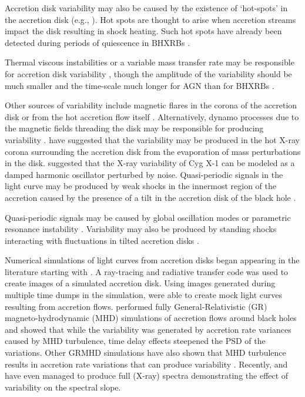 \documentclass[a4paper,fleqn,usenatbib]{mnras}
\begin{document}
Accretion disk variability may also be caused by the existence of `hot-spots' in the accretion disk (e.g., \citealt{MaccaroneAccretion}). Hot spots are thought to arise when accretion streams impact the disk resulting in shock heating. Such hot spots have already been detected during periods of quiescence in BHXRBs \citep{Froning11,McClintock95}.

Thermal viscous instabilities or a variable mass transfer rate may be responsible for accretion disk variability \citep{Lasota01,Coriat12}, though the amplitude of the variability should be much smaller and the time-scale much longer for AGN than for BHXRBs \citep{Hameury09}.

Other sources of variability include magnetic flares in the corona of the accretion disk \citep{PoutanenFabian99} or from the hot accretion flow itself \citep{Veledina13}. Alternatively, dynamo processes due to the magnetic fields threading the disk may be responsible for producing variability \citep{LivioPringleKing03,King04,MayerPringle06}. \citet{JaniukCzerny07} have suggested that the variability may be produced in the hot X-ray corona surrounding the accretion disk from the evaporation of mass perturbations in the disk. \citet{Misra08} suggested that the X-ray variability of Cyg X-1 can be modeled as a damped harmonic oscillator perturbed by noise. Quasi-periodic signals in the light curve may be produced by weak shocks in the innermost region of the accretion caused by the presence of a tilt in the accretion disk of the black hole \citep{FragileBlaes07,FragileBlaes08}.

Quasi-periodic signals may be caused by global oscillation modes or parametric resonance instability \citep{ReynoldsMiller09a,ReynoldsMiller09b,Oneill11}. Variability may also be produced by standing shocks interacting with fluctuations in tilted accretion disks \citep{Henisey12}.

Numerical simulations of light curves from accretion disks began appearing in the literature starting with \citet{Schnittman06}. A ray-tracing and radiative transfer code was used to create images of a simulated accretion disk. Using images generated during multiple time dumps in the simulation, \citet{Schnittman06} were able to create mock light curves resulting from accretion flows. \citet{Noble09} performed fully General-Relativistic (GR) magneto-hydrodynamic (MHD) simulations of accretion flows around black holes and showed that while the variability was generated by accretion rate variances caused by MHD turbulence, time delay effects steepened the PSD of the variations. Other GRMHD simulations have also shown that MHD turbulence results in accretion rate variations that can produce variability \citep{Moscibrodzka09,Dexter09,Dexter10}. Recently, \citet{Schnittman13a} and \citet{Schnittman13b} have even managed to produce full (X-ray) spectra demonstrating the effect of variability on the spectral slope.
\end{document}
